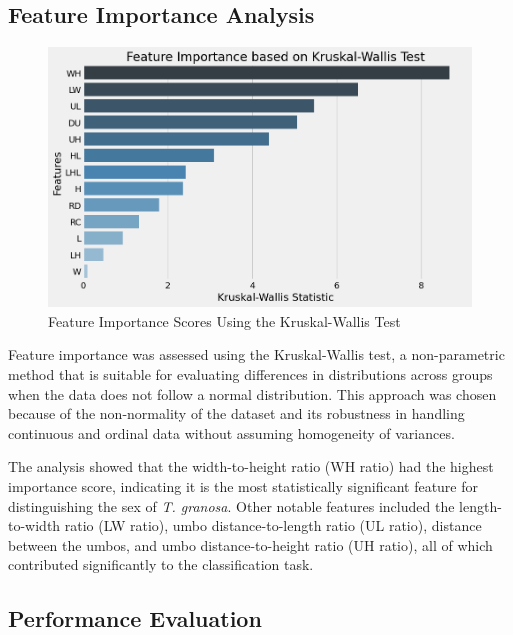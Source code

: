 \subsection{Feature Importance Analysis}

\begin{figure}[!htbp]
	\centering
	\includegraphics[width=1.0\textwidth]{figures/kw.png}
	\caption{Feature Importance Scores Using the Kruskal-Wallis Test}
	\label{fig:kw}
\end{figure}

Feature importance was assessed using the Kruskal-Wallis test, a non-parametric method that is suitable for evaluating differences in distributions across groups when the data does not follow a normal distribution. This approach was chosen because of the non-normality of the dataset and its robustness in handling continuous and ordinal data without assuming homogeneity of variances. \cite{ribeiro2024}

The analysis showed that the width-to-height ratio (WH ratio) had the highest importance score, indicating it is the most statistically significant feature for distinguishing the sex of \textit{T. granosa}. Other notable features included the length-to-width ratio (LW ratio), umbo distance-to-length ratio (UL ratio), distance between the umbos, and umbo distance-to-height ratio (UH ratio), all of which contributed significantly to the classification task.

\subsection{Performance Evaluation}
\label{tab:performance-eval}

